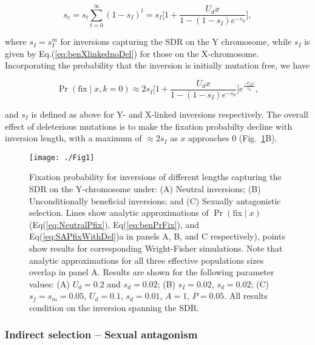 \documentclass{article}
\begin{document}
\begin{equation} \label{eq:benSe}
	s_{e} = s_t \sum_{t=0}^{\infty} (1 - s_I)^t = s_I \Bigg[1 + \frac{U_d x}{1 - (1-s_I)e^{-s_d}} \Bigg],
\end{equation}

\noindent where $s_I = s_{I}^{m}$ for inversions capturing the SDR on the Y chromosome, while $s_I$ is given by Eq.(\ref{eq:benXlinkednoDel}) for those on the X-chromosome. Incorporating the probability that the inversion is initially mutation free, we have

\begin{equation} \label{eq:benPrFix}
	\Pr(\text{fix} \mid x, k = 0) \approx 2 s_I \Bigg[ 1+ \frac{U_d x}{1 - (1-s_I)e^{-s_d}} \Bigg] e^{\frac{-U_d x}{s_d}},
\end{equation}

\noindent and $s_I$ is defined as above for Y- and X-linked inversions respectively. The overall effect of deleterious mutations is to make the fixation probabilty decline with inversion length, with a maximum of $\approx 2 s_I$ as $x$ approaches $0$ (Fig.~\ref{fig:fixProbFig}B). 
\vspace{12pt}




 \begin{figure}[htbp]
 \centering
 \texttt{[image: ./Fig1]}
 \caption{Fixation probability for inversions of different lengths capturing the SDR on the Y-chromosome under: (A) Neutral inversions; (B) Unconditionally beneficial inversions; and (C) Sexually antagonistic selection. Lines show analytic approximations of $\Pr(\text{fix} \mid x)$ (Eq(\ref{eq:NeutralPfix}), Eq(\ref{eq:benPrFix}), and Eq(\ref{eq:SAPfixWithDel})a in panels A, B, and C respectively), points show results for corresponding Wright-Fisher simulations. Note that analytic approximations for all three effective populations sizes overlap in panel A. Results are shown for the following parameter values: (A) $U_d = 0.2$ and $s_d = 0.02$; (B) $s_I = 0.02$, $s_d = 0.02$; (C) $s_f = s_m = 0.05$, $U_d = 0.1$, $s_d = 0.01$, $A = 1$, $P = 0.05$. All results condition on the inversion spanning the SDR.}
 \label{fig:fixProbFig}
 \end{figure}


\subsubsection*{Indirect selection -- Sexual antagonism}\label{sec:SexAntag}
\end{document}
